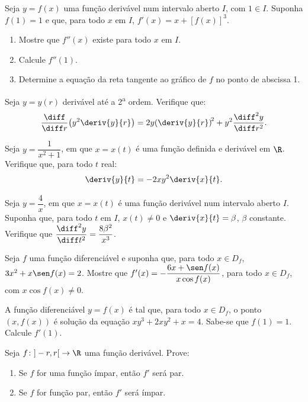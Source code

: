 \begin{exercicio}[23]
Seja $y = f(x)$ uma função derivável num intervalo aberto $I$, com $1 \in I$. Suponha $f(1) = 1$ e que, para todo $x$ em $I$, $f'(x) = x + [f(x)]^3$.
\begin{enumerate}[label=\alph*)]
    \item Mostre que $f''(x)$ existe para todo $x$ em $I$.
    \item Calcule $f''(1)$.
    \item Determine a equação da reta tangente ao gráfico de $f$ no ponto de abscissa 1.
\end{enumerate}
\end{exercicio}

\begin{exercicio}[24]
Seja $y = y(r)$ derivável até a 2\textsuperscript{a} ordem. Verifique que:
\[
\frac{\diff}{\diff r}\!\left(y^2 \deriv{y}{r}\right) = 2y\!\left(\deriv{y}{r}\right)^{\!2} + y^2 \frac{\diff^2 y}{\diff r^2}.
\]
\end{exercicio}

\begin{exercicio}[25]
Seja $y = \dfrac{1}{x^2 + 1}$, em que $x = x(t)$ é uma função definida e derivável em $\R$. Verifique que, para todo $t$ real:
\[
\deriv{y}{t} = -2xy^2 \deriv{x}{t}.
\]
\end{exercicio}

\begin{exercicio}[26]
Seja $y = \dfrac{4}{x}$, em que $x = x(t)$ é uma função derivável num intervalo aberto $I$. Suponha que, para todo $t$ em $I$, $x(t) \neq 0$ e $\deriv{x}{t} = \beta$, $\beta$ constante. Verifique que $\dfrac{\diff^2 y}{\diff t^2} = \dfrac{8\beta^2}{x^3}$.
\end{exercicio}

\begin{exercicio}[27]
Seja $f$ uma função diferenciável e suponha que, para todo $x \in D_f$, $3x^2 + x\sen f(x) = 2$. Mostre que $f'(x) = -\dfrac{6x + \sen f(x)}{x\cos f(x)}$, para todo $x \in D_f$, com $x\cos f(x) \neq 0$.
\end{exercicio}

\begin{exercicio}[28]
A função diferenciável $y = f(x)$ é tal que, para todo $x \in D_f$, o ponto $(x, f(x))$ é solução da equação $xy^3 + 2xy^2 + x = 4$. Sabe-se que $f(1) = 1$. Calcule $f'(1)$.
\end{exercicio}

\begin{exercicio}[29]
Seja $f\colon {]-r, r[} \to \R$ uma função derivável. Prove:
\begin{enumerate}[label=\alph*)]
    \item Se $f$ for uma função ímpar, então $f'$ será par.
    \item Se $f$ for função par, então $f'$ será ímpar.
\end{enumerate}
\end{exercicio}

